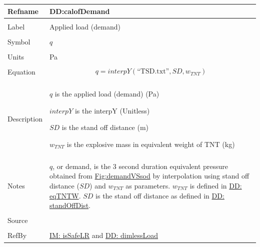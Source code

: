 \documentclass[12pt]{article}
\begin{document}
\noindent \begin{minipage}{\textwidth}
\begin{tabular}{>{\raggedright}p{}>{\raggedright\arraybackslash}p{}}
\toprule \textbf{Refname} & \textbf{DD:calofDemand}
\label{DD:calofDemand}
\\ \midrule \\
Label & Applied load (demand)
        
\\ \midrule \\
Symbol & $q$
         
\\ \midrule \\
Units & Pa
        
\\ \midrule \\
Equation & \begin{displaymath}
           q=interpY\left(\text{``TSD.txt''},SD,{w_{TNT}}\right)
           \end{displaymath}
\\ \midrule \\
Description & \begin{symbDescription}
              \item{$q$ is the applied load (demand) (Pa)}
              \item{$interpY$ is the interpY (Unitless)}
              \item{$SD$ is the stand off distance (m)}
              \item{${w_{TNT}}$ is the explosive mass in equivalent weight of TNT (kg)}
              \end{symbDescription}
\\ \midrule \\
Notes & $q$, or demand, is the 3 second duration equivalent pressure obtained from \hyperref[Figure:demandVSsod]{Fig:demandVSsod} by interpolation using stand off distance ($SD$) and ${w_{TNT}}$ as parameters. ${w_{TNT}}$ is defined in \hyperref[DD:eqTNTW]{DD: eqTNTW}. $SD$ is the stand off distance as defined in \hyperref[DD:standOffDist]{DD: standOffDist}.
        
\\ \midrule \\
Source & \cite{astm2009}
         
\\ \midrule \\
RefBy & \hyperref[IM:isSafeLR]{IM: isSafeLR} and \hyperref[DD:dimlessLoad]{DD: dimlessLoad}
        
\\ \bottomrule
\end{tabular}
\end{minipage}
\end{document}
